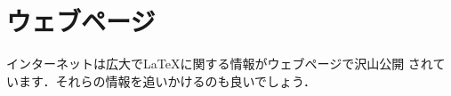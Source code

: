
\section{ウェブページ}

インターネットは広大で{\LaTeX}に関する情報がウェブページで沢山公開
されています．それらの情報を追いかけるのも良いでしょう．

\newcommand\weblab[1]{\item\relax\label{web:#1}}
\newcommand*\raisehyphen{\raise.2ex\hbox{-}}
\newenvironment{urllist}{%
   \begin{enumerate}[{{[URL\raisehyphen}A]}] \small}{\end{enumerate}}

